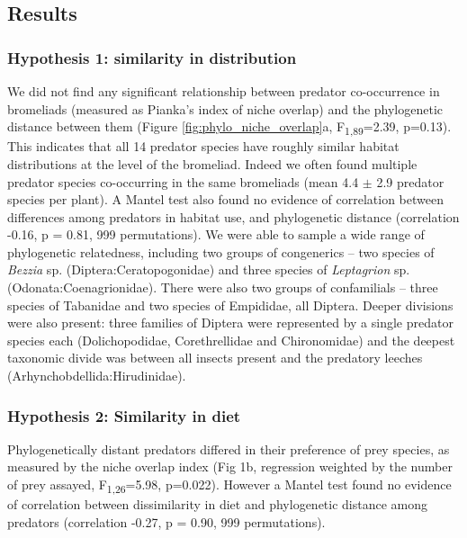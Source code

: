 \subsection{Results}\label{results}

\subsubsection{Hypothesis 1: similarity in
distribution}\label{hypothesis-1-similarity-in-distribution}

We did not find any significant relationship between predator
co-occurrence in bromeliads (measured as Pianka's index of niche
overlap) and the phylogenetic distance between them (Figure \ref{fig:phylo_niche_overlap}a,
F\textsubscript{1,89}=2.39, p=0.13). This indicates that all 14 predator
species have roughly similar habitat distributions at the level of the
bromeliad. Indeed we often found multiple predator species co-occurring
in the same bromeliads (mean 4.4 $\pm$ 2.9 predator species per plant). A
Mantel test also found no evidence of correlation between differences
among predators in habitat use, and phylogenetic distance (correlation
-0.16, p = 0.81, 999 permutations). We were able to sample a wide range
of phylogenetic relatedness, including two groups of congenerics -- two
species of \emph{Bezzia} sp. (Diptera:Ceratopogonidae) and three species
of \emph{Leptagrion} sp. (Odonata:Coenagrionidae). There were also two
groups of confamilials -- three species of Tabanidae and two species of
Empididae, all Diptera. Deeper divisions were also present: three
families of Diptera were represented by a single predator species each
(Dolichopodidae, Corethrellidae and Chironomidae) and the deepest
taxonomic divide was between all insects present and the predatory
leeches (Arhynchobdellida:Hirudinidae).

\subsubsection{Hypothesis 2: Similarity in
diet}\label{hypothesis-2-similarity-in-diet}

Phylogenetically distant predators differed in their preference of prey
species, as measured by the niche overlap index (Fig 1b, regression
weighted by the number of prey assayed, F\textsubscript{1,26}=5.98,
p=0.022). However a Mantel test found no evidence of correlation between
dissimilarity in diet and phylogenetic distance among predators
(correlation -0.27, p = 0.90, 999 permutations).

